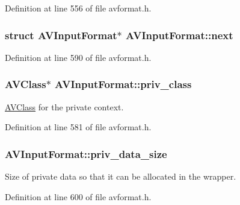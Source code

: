 Definition at line 556 of file avformat.\+h.

\subsubsection[{\texorpdfstring{next}{next}}]{\setlength{\rightskip}{0pt plus 5cm}struct {\bf A\+V\+Input\+Format}$\ast$ A\+V\+Input\+Format\+::next}\hypertarget{struct_a_v_input_format_ad18d8584bb0648f53a7980be8f368164}{}\label{struct_a_v_input_format_ad18d8584bb0648f53a7980be8f368164}


Definition at line 590 of file avformat.\+h.

\subsubsection[{\texorpdfstring{priv\+\_\+class}{priv_class}}]{ {\bf A\+V\+Class}$\ast$ A\+V\+Input\+Format\+::priv\+\_\+class}\hypertarget{struct_a_v_input_format_afaac829559ad9e07618c01a51d8a4c5f}{}\label{struct_a_v_input_format_afaac829559ad9e07618c01a51d8a4c5f}


\hyperlink{struct_a_v_class}{A\+V\+Class} for the private context. 



Definition at line 581 of file avformat.\+h.

\subsubsection[{\texorpdfstring{priv\+\_\+data\+\_\+size}{priv_data_size}}]{ A\+V\+Input\+Format\+::priv\+\_\+data\+\_\+size}\hypertarget{struct_a_v_input_format_a195b445886775084b8e075062d33f09a}{}\label{struct_a_v_input_format_a195b445886775084b8e075062d33f09a}
Size of private data so that it can be allocated in the wrapper. 

Definition at line 600 of file avformat.\+h.

